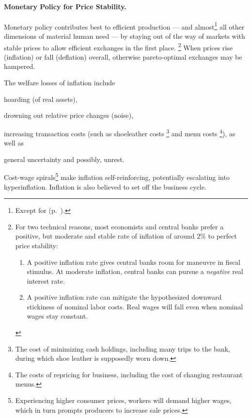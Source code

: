\paragraph{Monetary Policy for Price Stability.}  \label{sec:price-stability}
Monetary policy contributes best to efficient production --- and almost\footnote{
	Except for  (p.~\pageref{sec:monetary-stimulus}).}
all other dimensions of material human need --- by staying out of the way of markets with stable prices to allow efficient exchanges in the first place.
\footnote{
	For two technical reasons, most economists and central banks prefer a positive, but moderate and stable rate of inflation of around 2\% to perfect price stability:
	\begin{enumerate}
		\item A positive inflation rate gives central banks room for maneuvre in fiscal stimulus.
		At moderate inflation, central banks can pursue a \emph{negative} real interest rate.

		\item A positive inflation rate can mitigate the hypothesized downward stickiness of nominal labor costs.
		Real wages will fall even when nominal wages stay constant.
	\end{enumerate}
}
When prices rise (inflation) or fall (deflation) overall, otherwise pareto-optimal exchanges may be hampered.

The welfare losses of inflation include \begin{inparaenum}
	\item hoarding (of real assets),

	\item drowning out relative price changes (noise),

	\item increasing transaction costs (such as shoeleather costs
	\footnote{
		The cost of minimizing cash holdings, including many trips to the bank, during which shoe leather is supposedly worn down.
	}
	and menu costs
	\footnote{
		The costs of repricing for business, including the cost of changing restaurant menus.
	}),
	as well as

	\item general uncertainty and possibly, unrest.
\end{inparaenum}

Cost-wage spirals\footnote{Experiencing higher consumer prices, workers will demand higher wages, which in turn prompts producers to increase sale prices.} make inflation self-reinforcing, potentially escalating into hyperinflation.
Inflation is also believed to set off the business cycle.

